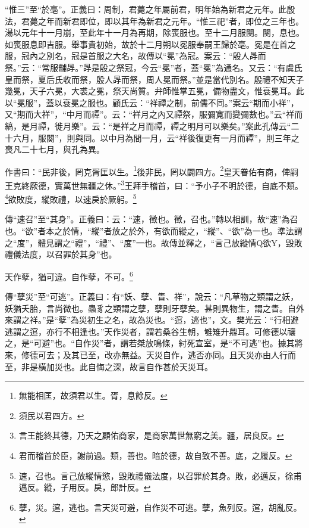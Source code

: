 {\noindent\shu{}\fzkt “惟三”至“於亳”。正義曰：周制，君薨之年屬前君，明年始為新君之元年。此殷法，君薨之年而新君即位，即以其年為新君之元年。“惟三祀”者，即位之三年也。湯以元年十一月崩，至此年十一月為再期，除喪服也。至十二月服闋。闋，息也。如喪服息即吉服。舉事貴初始，故於十二月朔以冕服奉嗣王歸於亳。冕是在首之服，冠內之別名，冠是首服之大名，故傳以“冕”為冠。案云：“殷人冔而祭。”云：“常服黼冔。”冔是殷之祭冠，今云“冕”者，蓋“冕”為通名。又云：“有虞氏皇而祭，夏后氏收而祭，殷人冔而祭，周人冕而祭。”並是當代別名。殷禮不知天子幾冕，天子六冕，大裘之冕，祭天尚質。弁師惟掌五冕，備物盡文，惟袞冕耳。此以“冕服”，蓋以袞冕之服也。顧氏云：“祥禫之制，前儒不同。”案云“期而小祥”，又“期而大祥”，“中月而禫”。云：“祥月之內又禫祭，服彌寬而變彌數也。”云“祥而縞，是月禫，徙月樂”。云：“是祥之月而禫，禫之明月可以樂矣。”案此孔傳云“二十六月，服闋”，則與同。以中月為間一月，云“祥後復更有一月而禫”，則三年之喪凡二十七月，與孔為異。 \par}

作書曰：“民非後，罔克胥匡以生。\footnote{無能相匡，故須君以生。胥，息餘反。}後非民，罔以闢四方。\footnote{須民以君四方。}皇天眷佑有商，俾嗣王克終厥德，實萬世無疆之休。”\footnote{言王能終其德，乃天之顧佑商家，是商家萬世無窮之美。疆，居良反。}王拜手稽首，曰：“予小子不明於德，自底不類。\footnote{君而稽首於臣，謝前過。類，善也。暗於德，故自致不善。底，之履反。}欲敗度，縱敗禮，以速戾於厥躬。\footnote{速，召也。言己放縱情慾，毀敗禮儀法度，以召罪於其身。敗，必邁反，徐甫邁反。縱，子用反。戾，郎計反。}

{\noindent\zhuan{}\fzbyks 傳“速召”至“其身”。正義曰：云：“速，徵也。徵，召也。”轉以相訓，故“速”為召也。“欲”者本之於情，“縱”者放之於外，有欲而縱之，“縱”、“欲”為一也。準法謂之“度”，體見謂之“禮”，“禮”、“度”一也。故傳並釋之，“言己放縱情Q欲Y，毀敗禮儀法度，以召罪於其身”也。 \par}

天作孽，猶可違。自作孽，不可。\footnote{孽，災。逭，逃也。言天災可避，自作災不可逃。孽，魚列反。逭，胡亂反。}

{\noindent\zhuan{}\fzbyks 傳“孽災”至“可逃”。正義曰：有“妖、孽、眚、祥”，說云：“凡草物之類謂之妖，妖猶夭胎，言尚微也。蟲豸之類謂之孽，孽則牙孽矣。甚則異物生，謂之眚。自外來謂之祥。”是“孽”為災初生之名，故為災也。“逭，逃也”，文。樊光云：“行相避逃謂之逭，亦行不相逢也。”天作災者，謂若桑谷生朝，雊雉升鼎耳。可修德以禳之，是“可避”也。“自作災”者，謂若桀放鳴條，紂死宣室，是“不可逃”也。據其將來，修德可去；及其已至，改亦無益。天災自作，逃否亦同。且天災亦由人行而至，非是橫加災也。此自悔之深，故言自作甚於天災耳。 \par}

